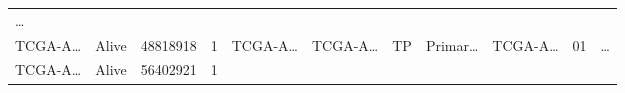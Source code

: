 \documentclass[
]{article}
\begin{document}
\begin{longtable}[]{@{}lllllllllll@{}}
\begin{minipage}[t]{0.03\columnwidth}
\ldots{}\strut
\end{minipage}\tabularnewline
\begin{minipage}[t]{0.07\columnwidth}\raggedright
TCGA-A\ldots{}\strut
\end{minipage} & \begin{minipage}[t]{0.04\columnwidth}\raggedright
Alive\strut
\end{minipage} & \begin{minipage}[t]{0.06\columnwidth}\raggedright
48818918\strut
\end{minipage} & \begin{minipage}[t]{0.07\columnwidth}\raggedright
1\strut
\end{minipage} & \begin{minipage}[t]{0.07\columnwidth}\raggedright
TCGA-A\ldots{}\strut
\end{minipage} & \begin{minipage}[t]{0.07\columnwidth}\raggedright
TCGA-A\ldots{}\strut
\end{minipage} & \begin{minipage}[t]{0.07\columnwidth}\raggedright
TP\strut
\end{minipage} & \begin{minipage}[t]{0.07\columnwidth}\raggedright
Primar\ldots{}\strut
\end{minipage} & \begin{minipage}[t]{0.09\columnwidth}\raggedright
TCGA-A\ldots{}\strut
\end{minipage} & \begin{minipage}[t]{0.10\columnwidth}\raggedright
01\strut
\end{minipage} & \begin{minipage}[t]{0.03\columnwidth}\raggedright
\ldots{}\strut
\end{minipage}\tabularnewline
\begin{minipage}[t]{0.07\columnwidth}\raggedright
TCGA-A\ldots{}\strut
\end{minipage} & \begin{minipage}[t]{0.04\columnwidth}\raggedright
Alive\strut
\end{minipage} & \begin{minipage}[t]{0.06\columnwidth}\raggedright
56402921\strut
\end{minipage} & \begin{minipage}[t]{0.07\columnwidth}\raggedright
1\strut
\end{minipage} & \begin{minipage}[t]{0.07\columnwidth}\raggedright

\end{minipage}
\end{longtable}
\end{document}
